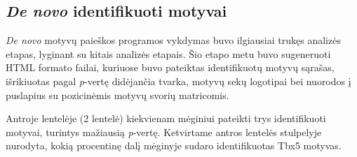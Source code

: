\documentclass[12pt]{article}
\begin{document}
\subsection{\emph{De novo} identifikuoti motyvai}
\emph{De novo} motyvų paieškos programos vykdymas buvo ilgiausiai trukęs
analizės etapas, lyginant su kitais analizės etapais. Šio etapo metu buvo
sugeneruoti HTML formato failai, kuriuose buvo pateiktas identifikuotų motyvų
sąrašas, išrikiuotas pagal \emph{p}-vertę didėjančia tvarka, motyvų sekų
logotipai bei nuorodos į puslapius su pozicinėmis motyvų svorių matricomis.

Antroje lentelėje (2 lentelė) kiekvienam mėginiui pateikti trys identifikuoti
motyvai, turintys mažiausią \emph{p}-vertę. Ketvirtame antros lentelės
stulpelyje nurodyta, kokią procentinę dalį mėginyje sudaro identifikuotas
Tbx5 motyvas.
\end{document}
